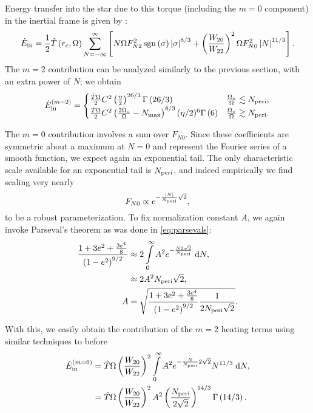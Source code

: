 \documentclass[
        fleqn,
        usenatbib,
        referee,
    ]{mnras}
\newcommand*{\abs}[1]{\left|#1\right|}
\newcommand*{\p}[1]{\left(#1\right)}
\newcommand*{\s}[1]{\left[#1\right]}
\DeclareMathOperator*{\sgn}{sgn}
\begin{document}
Energy transfer into the star due to this torque (including the $m = 0$
component) in the inertial frame is given by \citealp{vlf}:
\begin{align}
     \dot{E}_{\rm in} = \frac{1}{2}\hat{T}\p{r_c, \Omega}
         \sum\limits_{N = -\infty}^\infty\s{
            N\Omega F_{N2}^2 \sgn \p{\sigma} \abs{\sigma}^{8/3}
            + \p{\frac{W_{20}}{W_{22}}}^2\Omega F_{N0}^2 \abs{N}^{11/3}}.
            \label{eq:e_sum}
\end{align}
The $m=2$ contribution can be analyzed similarly to the previous section, with
an extra power of $N$; we obtain
\begin{equation}
    \dot{E}_{\rm in}^{(m = 2)} =
    \begin{cases}
        \frac{\hat{T}\Omega }{2} C^2
            \p{\frac{\eta}{2}}^{26/3}\Gamma\p{26/3} &
                \frac{\Omega_s}{\Omega} \lesssim N_{\rm peri},\\
        \frac{\hat{T}\Omega}{2} C^2
            \p{\frac{2\Omega_s}{\Omega} - N_{\max}}^{8/3}
                (\eta/2)^{6} \Gamma\p{6} &
                \frac{\Omega_s}{\Omega} \gtrsim N_{\rm peri}.
    \end{cases}
\end{equation}

The $m=0$ contribution involves a sum over $F_{N0}$. Since these coefficients
are symmetric about a maximum at $N = 0$ and represent the Fourier series of a
smooth function, we expect again an exponential tail. The only characteristic
scale available for an exponential tail is $N_{\rm peri}$, and indeed
empirically we find scaling very nearly
\begin{equation}
    F_{N0} \propto e^{-\frac{\abs{N}}{N_{\rm peri}}\sqrt{2}},
\end{equation}
to be a robust parameterization. To fix normalization constant $A$, we again
invoke Parseval's theorem as was done in \autoref{eq:parsevals}:
\begin{align}
    \frac{1 + 3e^2 + \frac{3e^4}{8}}{\p{1 - e^2}^{9/2}}
        &\approx 2\int\limits_0^\infty A^2e^{-\frac{N2\sqrt{2}}{N_{\rm peri}}}
            \;\mathrm{d}N,\\
        &\approx 2A^2N_{\rm peri}\sqrt{2},\\
    A &= \sqrt{\frac{1 + 3e^2 + \frac{3e^4}{8}}{\p{1 - e^2}^{9/2}}
        \frac{1}{2N_{\rm peri}\sqrt{2}}}.
\end{align}

With this, we easily obtain the contribution of the $m = 2$ heating terms using
similar techniques to before
\begin{align}
    \dot{E}_{\rm in}^{(m = 0)} &= \hat{T}\Omega
        \p{\frac{W_{20}}{W_{22}}}^2 \int\limits_0^\infty
            A^2 e^{-\frac{N}{N_{\rm peri}}2\sqrt{2}}N^{11/3}\;\mathrm{d}N,\\
        &= \hat{T} \Omega \p{\frac{W_{20}}{W_{22}}}^2 A^2
            \p{\frac{N_{\rm peri}}{2\sqrt{2}}}^{14/3}
            \Gamma\p{14/3}.
\end{align}
\end{document}
